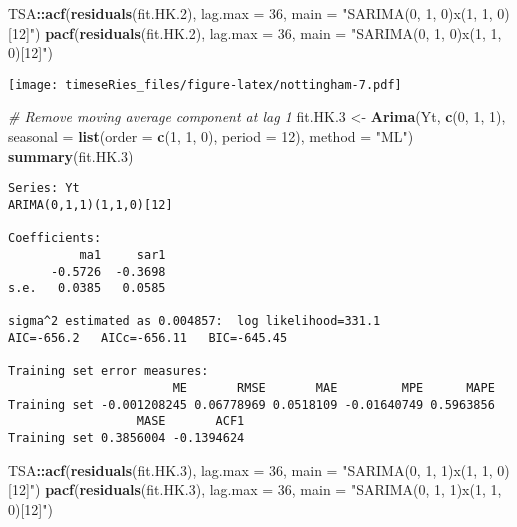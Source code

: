 \documentclass[]{book}
\newenvironment{Shaded}{\begin{snugshade}}{\end{snugshade}}
\newcommand{\KeywordTok}[1]{\textcolor[rgb]{0.13,0.29,0.53}{\textbf{#1}}}
\newcommand{\DataTypeTok}[1]{\textcolor[rgb]{0.13,0.29,0.53}{#1}}
\newcommand{\DecValTok}[1]{\textcolor[rgb]{0.00,0.00,0.81}{#1}}
\newcommand{\StringTok}[1]{\textcolor[rgb]{0.31,0.60,0.02}{#1}}
\newcommand{\CommentTok}[1]{\textcolor[rgb]{0.56,0.35,0.01}{\textit{#1}}}
\newcommand{\OperatorTok}[1]{\textcolor[rgb]{0.81,0.36,0.00}{\textbf{#1}}}
\newcommand{\NormalTok}[1]{#1}
\begin{document}
\begin{Shaded}
\begin{Highlighting}[]
\NormalTok{TSA}\OperatorTok{::}\KeywordTok{acf}\NormalTok{(}\KeywordTok{residuals}\NormalTok{(fit.HK.}\DecValTok{2}\NormalTok{), }\DataTypeTok{lag.max =} \DecValTok{36}\NormalTok{, }\DataTypeTok{main =} \StringTok{"SARIMA(0, 1, 0)x(1, 1, 0)[12]"}\NormalTok{)}
\KeywordTok{pacf}\NormalTok{(}\KeywordTok{residuals}\NormalTok{(fit.HK.}\DecValTok{2}\NormalTok{), }\DataTypeTok{lag.max =} \DecValTok{36}\NormalTok{, }\DataTypeTok{main =} \StringTok{"SARIMA(0, 1, 0)x(1, 1, 0)[12]"}\NormalTok{)}
\end{Highlighting}
\end{Shaded}

\texttt{[image: timeseRies\_files/figure-latex/nottingham-7.pdf]}

\begin{Shaded}
\begin{Highlighting}[]
\CommentTok{# Remove moving average component at lag 1}
\NormalTok{fit.HK.}\DecValTok{3}\NormalTok{ <-}\StringTok{ }\KeywordTok{Arima}\NormalTok{(Yt, }\KeywordTok{c}\NormalTok{(}\DecValTok{0}\NormalTok{, }\DecValTok{1}\NormalTok{, }\DecValTok{1}\NormalTok{), }\DataTypeTok{seasonal =} \KeywordTok{list}\NormalTok{(}\DataTypeTok{order =} \KeywordTok{c}\NormalTok{(}\DecValTok{1}\NormalTok{, }\DecValTok{1}\NormalTok{, }\DecValTok{0}\NormalTok{), }\DataTypeTok{period =} \DecValTok{12}\NormalTok{), }
    \DataTypeTok{method =} \StringTok{"ML"}\NormalTok{)}
\KeywordTok{summary}\NormalTok{(fit.HK.}\DecValTok{3}\NormalTok{)}
\end{Highlighting}
\end{Shaded}

\begin{verbatim}
Series: Yt 
ARIMA(0,1,1)(1,1,0)[12] 

Coefficients:
          ma1     sar1
      -0.5726  -0.3698
s.e.   0.0385   0.0585

sigma^2 estimated as 0.004857:  log likelihood=331.1
AIC=-656.2   AICc=-656.11   BIC=-645.45

Training set error measures:
                       ME       RMSE       MAE         MPE      MAPE
Training set -0.001208245 0.06778969 0.0518109 -0.01640749 0.5963856
                  MASE       ACF1
Training set 0.3856004 -0.1394624
\end{verbatim}

\begin{Shaded}
\begin{Highlighting}[]
\NormalTok{TSA}\OperatorTok{::}\KeywordTok{acf}\NormalTok{(}\KeywordTok{residuals}\NormalTok{(fit.HK.}\DecValTok{3}\NormalTok{), }\DataTypeTok{lag.max =} \DecValTok{36}\NormalTok{, }\DataTypeTok{main =} \StringTok{"SARIMA(0, 1, 1)x(1, 1, 0)[12]"}\NormalTok{)}
\KeywordTok{pacf}\NormalTok{(}\KeywordTok{residuals}\NormalTok{(fit.HK.}\DecValTok{3}\NormalTok{), }\DataTypeTok{lag.max =} \DecValTok{36}\NormalTok{, }\DataTypeTok{main =} \StringTok{"SARIMA(0, 1, 1)x(1, 1, 0)[12]"}\NormalTok{)}
\end{Highlighting}
\end{Shaded}
\end{document}
